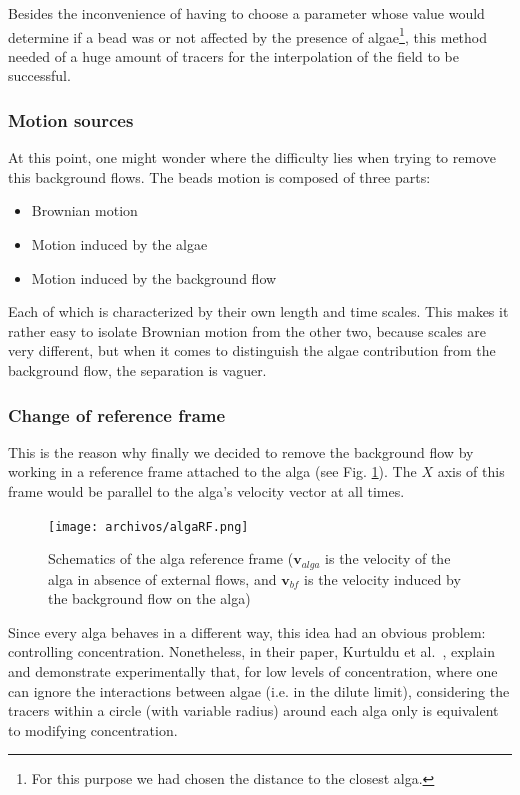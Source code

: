 Besides the inconvenience of having to choose a parameter whose value would determine if a bead was or not affected by the presence of algae\footnote{For this purpose we had chosen the distance to the closest alga.}, this method needed of a huge amount of tracers for the interpolation of the field to be successful. 

\subsubsection{Motion sources}

At this point, one might wonder where the difficulty lies when trying to remove this background flows. The beads motion is composed of three parts:

\begin{itemize}
	\item Brownian motion
	\item Motion induced by the algae 
	\item Motion induced by the background flow
\end{itemize}

Each of which is characterized by their own length and time scales. This makes it rather easy to isolate Brownian motion from the other two, because scales are very different, but when it comes to distinguish the algae contribution from the background flow, the separation is vaguer.

\subsubsection{Change of reference frame}

This is the reason why finally we decided to remove the background flow by working in a reference frame attached to the alga (see Fig. \ref{alga_RF}). The $X$ axis of this frame would be parallel to the alga's velocity vector at all times.

\begin{figure}[H]
	\centering
	\texttt{[image: archivos/algaRF.png]}
	\caption{Schematics of the alga reference frame ($\mathbf{v}_{alga}$ is the velocity of the alga in absence of external flows, and $\mathbf{v}_{bf}$ is the velocity induced by the background flow on the alga)}
	\label{alga_RF}
\end{figure}

Since every alga behaves in a different way, this idea had an obvious problem: controlling concentration. Nonetheless, in their paper, Kurtuldu et al.~\cite{Kurtuldu2011}, explain and demonstrate experimentally that, for low levels of concentration, where one can ignore the interactions between algae (i.e. in the dilute limit), considering the tracers within a circle (with variable radius) around each alga only is equivalent to modifying concentration.  

